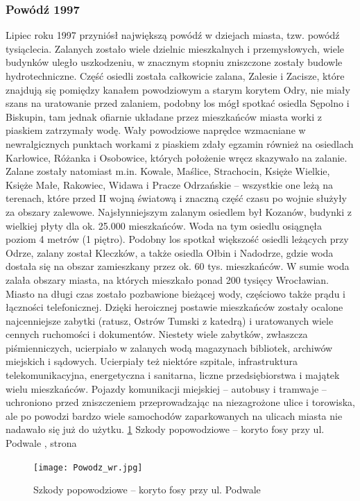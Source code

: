 \documentclass{article}
\begin{document}
\subsubsection{Powódź 1997}
\vspace{3mm} %
\newline Lipiec roku 1997 przyniósł największą powódź w dziejach miasta, tzw. powódź tysiąclecia. Zalanych zostało wiele dzielnic mieszkalnych i przemysłowych, wiele budynków uległo uszkodzeniu, w znacznym stopniu zniszczone zostały budowle hydrotechniczne. Część osiedli została całkowicie zalana, Zalesie i Zacisze, które znajdują się pomiędzy kanałem powodziowym a starym korytem Odry, nie miały szans na uratowanie przed zalaniem, podobny los mógł spotkać osiedla Sępolno i Biskupin, tam jednak ofiarnie układane przez mieszkańców miasta worki z piaskiem zatrzymały wodę. Wały powodziowe naprędce wzmacniane w newralgicznych punktach workami z piaskiem zdały egzamin również na osiedlach Karłowice, Różanka i Osobowice, których położenie wręcz skazywało na zalanie. Zalane zostały natomiast m.in. Kowale, Maślice, Strachocin, Księże Wielkie, Księże Małe, Rakowiec, Widawa i Pracze Odrzańskie – wszystkie one leżą na terenach, które przed II wojną światową i znaczną część czasu po wojnie służyły za obszary zalewowe. Najsłynniejszym zalanym osiedlem był Kozanów, budynki z wielkiej płyty dla ok. 25.000 mieszkańców. Woda na tym osiedlu osiągnęła poziom 4 metrów (1 piętro). Podobny los spotkał większość osiedli leżących przy Odrze, zalany został Kleczków, a także osiedla Ołbin i Nadodrze, gdzie woda dostała się na obszar zamieszkany przez ok. 60 tys. mieszkańców. W sumie woda zalała obszary miasta, na których mieszkało ponad 200 tysięcy Wrocławian. Miasto na długi czas zostało pozbawione bieżącej wody, częściowo także prądu i łączności telefonicznej. Dzięki heroicznej postawie mieszkańców zostały ocalone najcenniejsze zabytki (ratusz, Ostrów Tumski z katedrą) i uratowanych wiele cennych ruchomości i dokumentów. Niestety wiele zabytków, zwłaszcza piśmienniczych, ucierpiało w zalanych wodą magazynach bibliotek, archiwów miejskich i sądowych. Ucierpiały też niektóre szpitale, infrastruktura telekomunikacyjna, energetyczna i sanitarna, liczne przedsiębiorstwa i majątek wielu mieszkańców. Pojazdy komunikacji miejskiej – autobusy i tramwaje – uchroniono przed zniszczeniem przeprowadzając na niezagrożone ulice i torowiska, ale po powodzi bardzo wiele samochodów zaparkowanych na ulicach miasta nie nadawało się już do użytku.
\newline\ref{fig:powodz} Szkody popowodziowe – koryto fosy przy ul. Podwale , strona \pageref{fig:powodz}
\begin{figure}[h!]
\centering
\texttt{[image: Powodz\_wr.jpg]}
\caption{Szkody popowodziowe – koryto fosy przy ul. Podwale}
\label{fig:powodz}
\end{figure}
\end{document}
